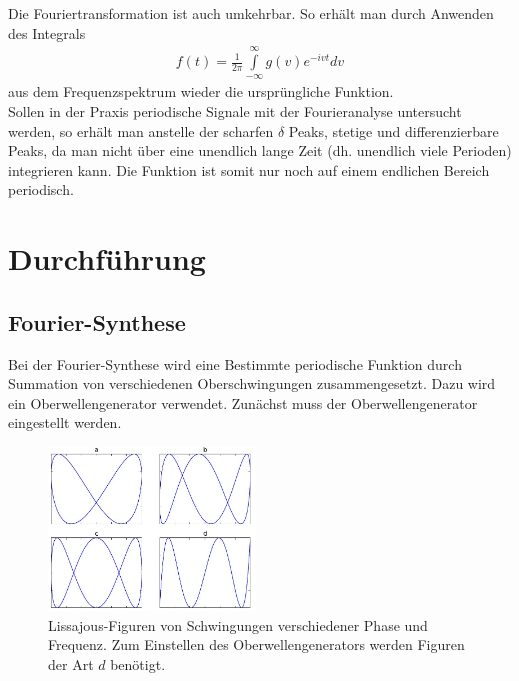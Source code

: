 Die Fouriertransformation ist auch umkehrbar. So erhält man durch Anwenden des Integrals
\begin{align}
f(t) = \frac{1}{2\pi} \int \limits ^\infty _{-\infty} g(v) e^{-ivt} dv
\label{eq-ruecktrafo}
\end{align}
aus dem Frequenzspektrum wieder die ursprüngliche Funktion.\\

Sollen in der Praxis periodische Signale mit der Fourieranalyse untersucht werden, so erhält man anstelle der scharfen $\delta$ Peaks, stetige und differenzierbare Peaks, da man nicht über eine unendlich lange Zeit (dh. unendlich viele Perioden) integrieren kann. Die Funktion ist somit nur noch auf einem endlichen Bereich periodisch. 

\section{Durchführung}
	\subsection{Fourier-Synthese}
		Bei der Fourier-Synthese wird eine Bestimmte periodische Funktion durch Summation von verschiedenen Oberschwingungen
		zusammengesetzt. Dazu wird ein Oberwellengenerator verwendet. Zunächst muss der Oberwellengenerator eingestellt werden.
		
		\begin{figure}
			\begin{center}
				\includegraphics[width=0.49\textwidth]{pics/lissajous.jpg}
				\caption{Lissajous-Figuren von Schwingungen verschiedener Phase und Frequenz. Zum Einstellen des Oberwellengenerators werden Figuren der Art $d$ benötigt.}
				\label{fig:lissajous}
			\end{center}
		\end{figure}
						
